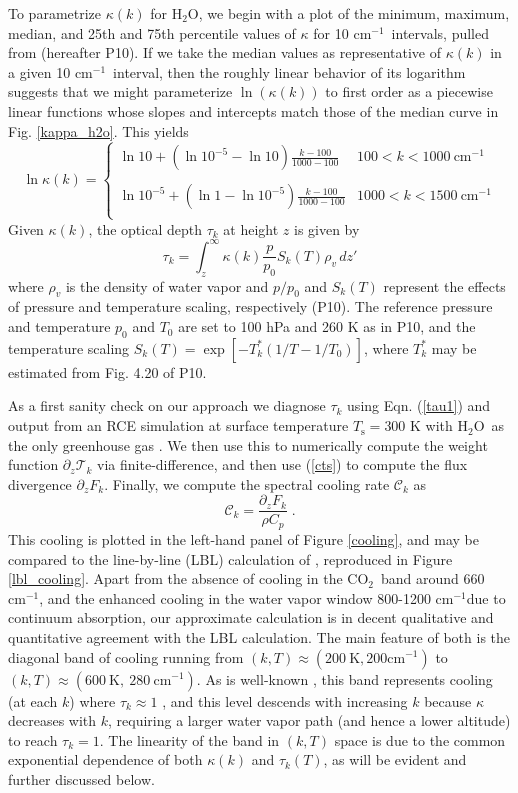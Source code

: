 \documentclass[10pt]{article}
\newcommand{\beqn}{\begin{equation}}
\newcommand{\eeqn}{\end{equation}}
\newcommand{\eqnref}[1]{(\ref{#1})}
\newcommand{\ppz}{\ensuremath{\partial_z}}
\newcommand{\cotwo}{\ensuremath{\mathrm{CO_2}}}
\newcommand{\htwo}{\ensuremath{\mathrm{H_2O}}}
\newcommand{\FLW}{\ensuremath{F}}
\newcommand{\trans}{\ensuremath{\mathcal{T}}}
\newcommand{\cool}{\ensuremath{\mathcal{C}}}
\newcommand{\cminverse}{\ensuremath{\mathrm{cm^{-1}}}}
\newcommand{\pierre}{P10}
\newcommand{\Ts}{\ensuremath{T_\mathrm{s}}}
\begin{document}
To parametrize $\kappa(k)$ for \htwo, we begin with a plot of the minimum, maximum, median, and 25th and 75th percentile values of $\kappa$ for 10 \cminverse\ intervals, pulled from \cite{pierrehumbert2010} (hereafter \pierre). If we take the median values as representative of $\kappa(k)$ in a given 10 \cminverse\ interval, then the roughly
linear behavior of its logarithm suggests that we might parameterize $\ln(\kappa(k))$  to first order as a piecewise linear functions whose slopes and intercepts match those of the median curve in Fig. \ref{kappa_h2o}. This yields
\beqn
	\ln \kappa(k) = \left\{ \begin{array}{lc}
						\ln 10 + (\ln 10^{-5} -\ln 10)\frac{k-100}{1000-100} & 100 < k < 1000 \ \cminverse \\
							& \\
						\ln 10^{-5} + (\ln 1 -\ln 10^{-5})\frac{k-100}{1000-100} & 1000 < k < 1500 \ \cminverse \\
					\end{array} \right.								
\label{kappa_param}
\eeqn
Given $\kappa(k)$, the optical depth $\tau_k$ at height $z$ is given by 
	\beqn
		\tau_k = \int_z^\infty \kappa(k) \frac{p}{p_0}S_k(T) \rho_v\, dz'  \label{tau1}
	\eeqn
where $\rho_v$ is the density of water vapor and $p/p_0$ and $S_k(T)$ represent the effects of pressure and temperature scaling, respectively (\pierre). The reference pressure and temperature $p_0$ and $T_0$ are set to 100 hPa and 260 K as in \pierre, and the temperature scaling  $S_k(T) =  \exp[-T_k^*(1/T-1/T_0)]$, where $T_k^*$ may be estimated from Fig. 4.20 of \pierre. 

As a first sanity check on our approach we diagnose $\tau_k$ using Eqn. \eqnref{tau1} and output from an RCE simulation at surface temperature $\Ts=300$ K with \htwo\ as the only greenhouse gas .  We then use this to numerically compute the weight function $\ppz\trans_k$ via finite-difference, and then use \eqnref{cts} to compute the flux divergence $\ppz \FLW_k$. Finally, we  compute the spectral cooling rate $\cool_k$ as 
	\beqn
		\cool_k  = \frac{\ppz \FLW_k}{\rho C_p} \; .   \label{cooling}
	\eeqn
This cooling is plotted in the left-hand panel of Figure \ref{cooling}, and  may be compared to the line-by-line (LBL) calculation of \cite{huang2013}, reproduced in Figure \ref{lbl_cooling}. Apart from the absence of cooling in the  \cotwo\ band around 660 \cminverse, and the enhanced cooling in the water vapor window 800-1200 \cminverse due to continuum absorption, our approximate calculation is in decent qualitative and quantitative agreement with the LBL calculation. The main feature of both is  the diagonal band of cooling running from $(k,T) \approx (200\ \mathrm{K} ,200 \cminverse) $ to $(k,T) \approx (600\ \mathrm{K},\ 280\  \cminverse)$. As is well-known \citep[e.g.][]{goldblatt2013}, this band represents cooling (at each $k$) where  $\tau_k\approx 1$ \citep[e.g.,][]{wallace2006}, and this level descends with increasing $k$ because $\kappa$ decreases with $k$, requiring a larger water vapor path (and hence a lower altitude) to reach $\tau_k=1$. The linearity of the band in $(k,T)$ space is due to the common exponential dependence of both $\kappa(k)$ and $\tau_k(T)$, as will be evident and further discussed below.
\end{document}

